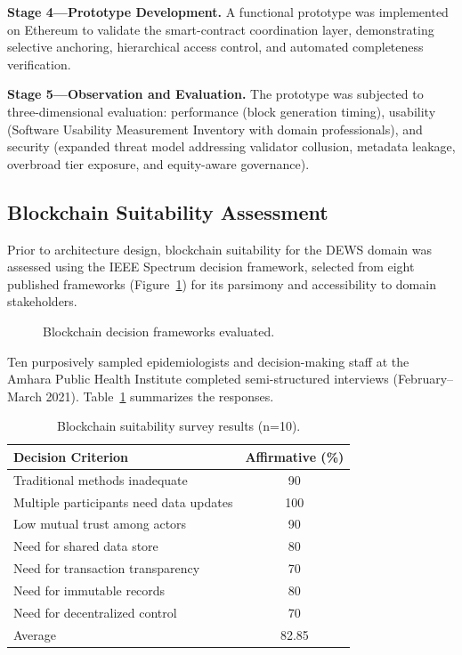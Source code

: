 \textbf{Stage 4---Prototype Development.} A functional prototype was implemented on Ethereum to validate the smart-contract coordination layer, demonstrating selective anchoring, hierarchical access control, and automated completeness verification.

\textbf{Stage 5---Observation and Evaluation.} The prototype was subjected to three-dimensional evaluation: performance (block generation timing), usability (Software Usability Measurement Inventory with domain professionals), and security (expanded threat model addressing validator collusion, metadata leakage, overbroad tier exposure, and equity-aware governance).

\subsection{Blockchain Suitability Assessment}\label{subsec:suitability}

Prior to architecture design, blockchain suitability for the DEWS domain was assessed using the IEEE Spectrum decision framework\cite{peck2017blockchain}, selected from eight published frameworks (Figure~\ref{fig:frameworks}) for its parsimony and accessibility to domain stakeholders.

\begin{figure}[!ht]
\centering
{}
\caption{Blockchain decision frameworks evaluated.}\label{fig:frameworks}
\end{figure}

Ten purposively sampled epidemiologists and decision-making staff at the Amhara Public Health Institute completed semi-structured interviews (February--March 2021). Table~\ref{tab:survey} summarizes the responses.

\begin{table}[!ht]
\caption{Blockchain suitability survey results (n=10).}\label{tab:survey}
\begin{tabular*}{\columnwidth}{@{\extracolsep\fill}lc@{}}
\toprule
Decision Criterion & Affirmative (\%) \\
\midrule
Traditional methods inadequate & 90 \\
Multiple participants need data updates & 100 \\
Low mutual trust among actors & 90 \\
Need for shared data store & 80 \\
Need for transaction transparency & 70 \\
Need for immutable records & 80 \\
Need for decentralized control & 70 \\
\midrule
Average & 82.85 \\
\bottomrule
\end{tabular*}
\end{table}

